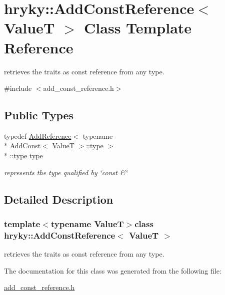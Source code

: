 \hypertarget{classhryky_1_1_add_const_reference}{\section{hryky\-:\-:Add\-Const\-Reference$<$ Value\-T $>$ Class Template Reference}
\label{classhryky_1_1_add_const_reference}
}


retrieves the traits as const reference from any type.  




{\ttfamily \#include $<$add\-\_\-const\-\_\-reference.\-h$>$}

\subsection*{Public Types}
\begin{DoxyCompactItemize}
\item 
\hypertarget{classhryky_1_1_add_const_reference_aa26e39e87462673d865c90e6a9798b5a}{typedef \hyperlink{classhryky_1_1_add_reference}{Add\-Reference}$<$ typename \\*
\hyperlink{classhryky_1_1_add_const}{Add\-Const}$<$ Value\-T $>$\-::\hyperlink{classhryky_1_1_add_const_reference_aa26e39e87462673d865c90e6a9798b5a}{type} $>$\\*
\-::\hyperlink{classhryky_1_1_add_const_reference_aa26e39e87462673d865c90e6a9798b5a}{type} \hyperlink{classhryky_1_1_add_const_reference_aa26e39e87462673d865c90e6a9798b5a}{type}}\label{classhryky_1_1_add_const_reference_aa26e39e87462673d865c90e6a9798b5a}

\begin{DoxyCompactList}\small\item\em represents the type qualified by \char`\"{}const \&\char`\"{} \end{DoxyCompactList}\end{DoxyCompactItemize}


\subsection{Detailed Description}
\subsubsection*{template$<$typename Value\-T$>$class hryky\-::\-Add\-Const\-Reference$<$ Value\-T $>$}

retrieves the traits as const reference from any type. 

The documentation for this class was generated from the following file\-:\begin{DoxyCompactItemize}
\item 
\hyperlink{add__const__reference_8h}{add\-\_\-const\-\_\-reference.\-h}\end{DoxyCompactItemize}
